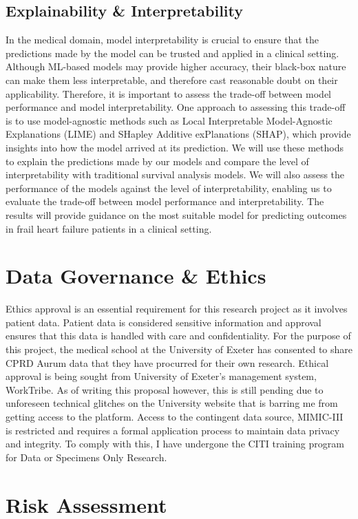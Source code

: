 \documentclass[%
 reprint,
 amsmath,amssymb,
 aps,
 nofootinbib
]{revtex4-2}
\theoremstyle{definition}
\begin{document}
\subsection{\label{expla}Explainability \& Interpretability}
In the medical domain, model interpretability is crucial to ensure that the predictions made by the model can be trusted and applied in a clinical setting. Although ML-based models may provide higher accuracy, their black-box nature can make them less interpretable, and therefore cast reasonable doubt on their applicability. Therefore, it is important to assess the trade-off between model performance and model interpretability. One approach to assessing this trade-off is to use model-agnostic methods such as Local Interpretable Model-Agnostic Explanations (LIME) and SHapley Additive exPlanations (SHAP), which provide insights into how the model arrived at its prediction. We will use these methods to explain the predictions made by our models and compare the level of interpretability with traditional survival analysis models. We will also assess the performance of the models against the level of interpretability, enabling us to evaluate the trade-off between model performance and interpretability. The results will provide guidance on the most suitable model for predicting outcomes in frail heart failure patients in a clinical setting.

\section{\label{gov}Data Governance \& Ethics}
Ethics approval is an essential requirement for this research project as it involves patient data. Patient data is considered sensitive information and approval ensures that this data is handled with care and confidentiality. For the purpose of this project, the medical school at the University of Exeter has consented to share CPRD Aurum data that they have procurred for their own research. Ethical approval is being sought from University of Exeter's management system, WorkTribe. As of writing this proposal however, this is still pending due to unforeseen technical glitches on the University website that is barring me from getting access to the platform. Access to the contingent data source, MIMIC-III is restricted and requires a formal application process to maintain data privacy and integrity. To comply with this, I have undergone the CITI training program for Data or Specimens Only Research.

\section{\label{risk}Risk Assessment}
\end{document}
